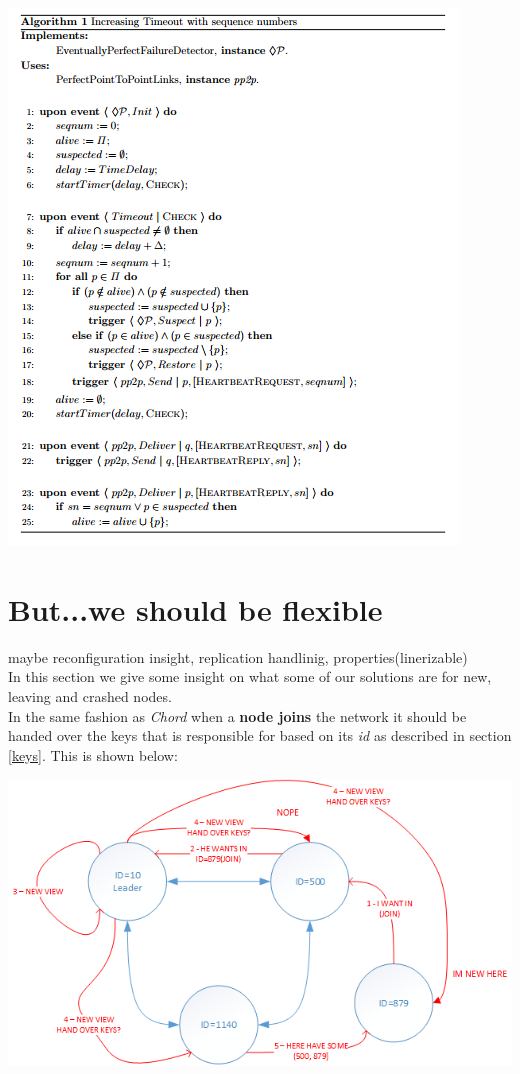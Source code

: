 \documentclass[a4paper, 11pt]{article}
\begin{document}
{\centering\includegraphics[scale = 1]{./figures/epfd-algorithm.png}\par}

\clearpage

\section{But...we should be flexible}

\noindent maybe reconfiguration insight, replication handlinig, properties(linerizable) \\

\noindent In this section we give some insight on what some of our solutions are for new, leaving and crashed nodes. \\
\noindent In the same fashion as \textit{Chord} when a \textbf{node joins} the network it should be handed over the keys that is responsible for based on its \textit{id} as described in section \ref{keys}. This is shown below:

{\centering\includegraphics[scale = 0.90]{./figures/nodejoin.png}\par}
\end{document}
